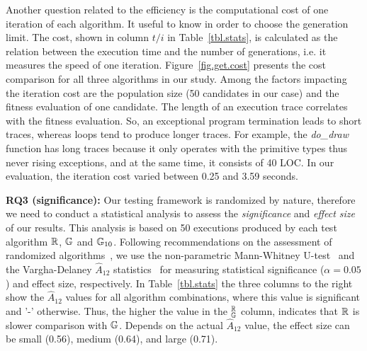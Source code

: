 Another question related to the efficiency is the computational cost of one iteration of each algorithm. It useful to know in order to choose the generation limit. The cost, shown in column $t/i$ in Table~\ref{tbl.stats}, is calculated as the relation between the execution time and the number of generations, i.e. it measures the speed of one iteration. Figure~\ref{fig.get.cost} presents the cost comparison for all three algorithms in our study. Among the factors impacting the iteration cost are the population size (50 candidates in our case) and the fitness evaluation of one candidate. The length of an execution trace correlates with the fitness evaluation. So, an exceptional program termination leads to short traces, whereas loops tend to produce longer traces. For example, the \emph{do_draw} function has long traces because it only operates with the primitive types thus never rising exceptions, and at the same time, it consists of 40 LOC. In our evaluation, the iteration cost varied between 0.25 and 3.59 seconds.\\

\textbf{RQ3 (significance):} Our testing framework is randomized by nature, therefore we need to conduct a statistical analysis to assess the \emph{significance} and \emph{effect size} of our results. This analysis is based on 50 executions produced by each test algorithm $\mathbb{R}$, $\mathbb{G}$ and $\mathbb{G}_{10}$. Following recommendations on the assessment of randomized algorithms~\cite{arcuri2011practical}, we use the non-parametric Mann-Whitney U-test~\cite{mann1947test} and the Vargha-Delaney $\hat{A}_{12}$ statistics~\cite{vargha2000critique} for measuring statistical significance ($\alpha=0.05$) and effect size, respectively. In Table~\ref{tbl.stats} the three columns to the right show the $\hat{A}_{12}$ values for all algorithm combinations, where this value is significant and '-' otherwise. Thus, the higher the value in the $_{\mathbb{G}}^{\mathbb{R}}$ column, indicates that $\mathbb{R}$ is slower comparison with $\mathbb{G}$. Depends on the actual $\hat{A}_{12}$ value, the effect size can be small (0.56), medium (0.64), and large (0.71).\\

